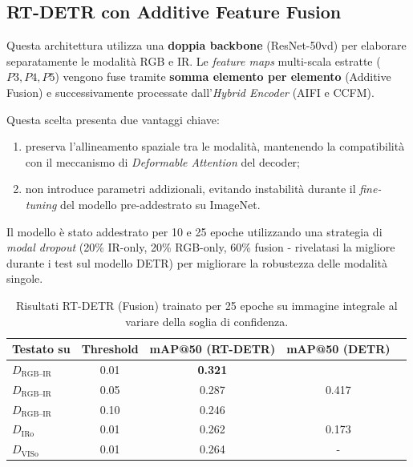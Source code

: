 \documentclass[a4paper,11pt]{article}
\begin{document}
\subsection*{RT-DETR con Additive Feature Fusion}
Questa architettura utilizza una \textbf{doppia backbone} (ResNet-50vd) 
per elaborare separatamente le modalità RGB e IR. Le \emph{feature maps} 
multi-scala estratte ($P3, P4, P5$) vengono fuse tramite 
\textbf{somma elemento per elemento} (Additive Fusion) e successivamente 
processate dall'\emph{Hybrid Encoder} (AIFI e CCFM). 

Questa scelta presenta due vantaggi chiave: 
\begin{enumerate}
    \item preserva l'allineamento spaziale tra le modalità, mantenendo 
        la compatibilità con il meccanismo di \emph{Deformable Attention} del decoder; 
    \item non introduce parametri addizionali, evitando instabilità 
        durante il \emph{fine-tuning} del modello pre-addestrato su ImageNet.
\end{enumerate}

Il modello è stato addestrato per 10 e 25 epoche utilizzando una strategia 
di \emph{modal dropout} (20\% IR-only, 20\% RGB-only, 60\% fusion - rivelatasi la migliore durante i test sul modello DETR)
per migliorare la robustezza delle modalità singole.

\begin{table}[h]
\centering
\caption{Risultati RT-DETR (Fusion) trainato per 25 epoche su immagine integrale al variare della soglia di confidenza.}
\label{tab:rtdetr_base_25}
\begin{tabular}{lcccc}
\toprule
Testato su & Threshold & mAP@50 (RT-DETR) & mAP@50 (DETR) \\
\midrule
$D_{\text{RGB--IR}}$ & 0.01 & \textbf{0.321} & \multirow{3}{*}{0.417} \\
$D_{\text{RGB--IR}}$ & 0.05 & 0.287 & \\
$D_{\text{RGB--IR}}$ & 0.10 & 0.246 & \\
\midrule
$D_{\text{IRo}}$ & 0.01 & 0.262 & 0.173 \\
$D_{\text{VISo}}$ & 0.01 & 0.264 & - \\
\bottomrule
\end{tabular}
\end{table}
\end{document}
